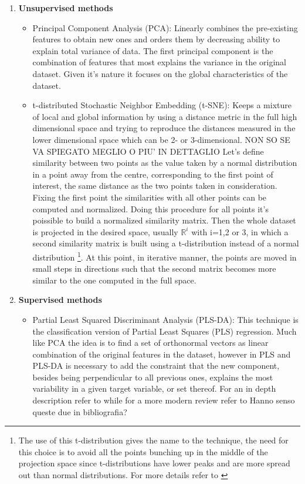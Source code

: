 \begin{enumerate}
\item \textbf{Unsupervised methods}
	\begin{itemize}
		\item Principal Component Analysis (PCA): Linearly combines the pre-existing features to obtain new ones and orders them by decreasing ability to explain total variance of data. The first principal component is the combination of features that most explains the variance in the original dataset. Given it's nature it focuses on the global characteristics of the dataset.
		\item t-distributed Stochastic Neighbor Embedding (t-SNE): Keeps a mixture of local and global information by using a distance metric in the full high dimensional space and trying to reproduce the distances measured in the lower dimensional space which can be 2- or 3-dimensional. {\large NON SO SE VA SPIEGATO MEGLIO O PIU' IN DETTAGLIO}\newline
			Let's define similarity between two points as the value taken by a normal distribution in a point away from the centre, corresponding to the first point of interest, the same distance as the two points taken in consideration. Fixing the first point the similarities with all other points can be computed and normalized. Doing this procedure for all points it's poissible to build a normalized similarity matrix. Then the whole dataset is projected in the desired space, usually $\mathbb{R}^i$ with i=1,2 or 3, in which a second similarity matrix is built using a t-distribution instead of a normal distribution \footnote{The use of this t-distribution gives the name to the technique, the need for this choice is to avoid all the points bunching up in the middle of the projection space since t-distributions have lower peaks and are more spread out than normal distributions. For more details refer to \cite{t-sne}}. At this point, in iterative manner, the points are moved in small steps in directions such that the second matrix becomes more similar to the one computed in the full space.
\end{itemize}

\item \textbf{Supervised methods}
	\begin{itemize}
	\item Partial Least Squared Discriminant Analysis (PLS-DA): This technique is the classification version of Partial Least Squares (PLS) regression. Much like PCA the idea is to find a set of orthonormal vectors as linear combination of the original features in the dataset, however in PLS and PLS-DA is necessary to add the constraint that the new component, besides being perpendicular to all previous ones, explains the most variability in a given target variable, or set thereof. For an in depth description refer to \cite{PLSDA} while for a more modern review refer to \cite{PLSDA_review} \large{Hanno senso queste due in bibliografia?}
	\end{itemize}


\end{enumerate}
